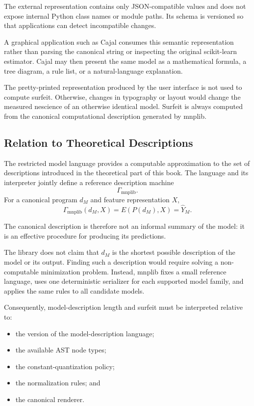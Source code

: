 The external representation contains only JSON-compatible values and does not
expose internal Python class names or module paths. Its schema is versioned so
that applications can detect incompatible changes.

A graphical application such as Cajal consumes this semantic representation
rather than parsing the canonical string or inspecting the original
scikit-learn estimator. Cajal may then present the same model as a mathematical
formula, a tree diagram, a rule list, or a natural-language explanation.

The pretty-printed representation produced by the user interface is not used
to compute surfeit. Otherwise, changes in typography or layout would change the
measured nescience of an otherwise identical model. Surfeit is always computed
from the canonical computational description generated by mnplib.

\subsection{Relation to Theoretical Descriptions}

The restricted model language provides a computable approximation to the set
of descriptions introduced in the theoretical part of this book. The language
and its interpreter jointly define a reference description machine
\[
\Gamma_{\mathrm{mnplib}}.
\]
For a canonical program \(d_M\) and feature representation \(X\),
\[
\Gamma_{\mathrm{mnplib}}(d_M,X)
=
E(P(d_M),X)
=
\widehat{Y}_M.
\]

The canonical description is therefore not an informal summary of the model:
it is an effective procedure for producing its predictions.

The library does not claim that \(d_M\) is the shortest possible description of
the model or its output. Finding such a description would require solving a
non-computable minimization problem. Instead, mnplib fixes a small reference
language, uses one deterministic serializer for each supported model family,
and applies the same rules to all candidate models.

Consequently, model-description length and surfeit must be interpreted relative
to:

\begin{itemize}
    \item the version of the model-description language;
    \item the available AST node types;
    \item the constant-quantization policy;
    \item the normalization rules; and
    \item the canonical renderer.
\end{itemize}

